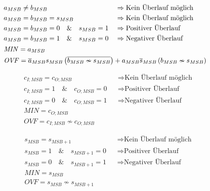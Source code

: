\begin{boxleft}
\end{boxleft}\begin{boxrightshaded}
\begin{align*}
&\begin{aligned}
&a_{MSB}\neq b_{MSB}\hfill&&\Rightarrow \text{Kein Überlauf möglich}\\
&a_{MSB}=b_{MSB}=s_{MSB}&&\Rightarrow \text{Kein Überlauf möglich}\\
&a_{MSB}=b_{MSB}=0 \quad\&\quad s_{MSB}=1&&\Rightarrow \text{Positiver Überlauf}\\
&a_{MSB}=b_{MSB}=1 \quad\&\quad s_{MSB}=0&&\Rightarrow \text{Negativer Überlauf}
\end{aligned}\\
&\mathit{MIN}=a_{MSB}\\
&\mathit{OVF}=\overline{a}_{MSB}s_{MSB}\left(\overline{b_{MSB}\nsim s_{MSB}}\right)+a_{MSB}\overline{s}_{MSB}\left(b_{MSB}\nsim s_{MSB}\right)
\end{align*}
\end{boxrightshaded}

\begin{boxleft}
\end{boxleft}\begin{boxrightshaded}
\begin{align*}
&c_{I;MSB}= c_{O;MSB}&&\Rightarrow \text{Kein Überlauf möglich}\\
&c_{I;MSB}=1\quad\&\quad c_{O;MSB}=0&&\Rightarrow \text{Positiver Überlauf}\\
&c_{I;MSB}=0\quad\&\quad c_{O;MSB}=1&&\Rightarrow \text{Negativer Überlauf}\\
&\mathit{MIN}=c_{O;MSB}\\
&\mathit{OVF}=c_{I;MSB}\nsim c_{O;MSB}
\end{align*}
\end{boxrightshaded}

\begin{boxleft}
\end{boxleft}\begin{boxrightshaded}
\begin{align*}
&s_{MSB}= s_{MSB+1}&&\Rightarrow \text{Kein Überlauf möglich}\\
&s_{MSB}=1\quad\&\quad s_{MSB+1}=0&&\Rightarrow \text{Positiver Überlauf}\\
&s_{MSB}=0\quad\&\quad s_{MSB+1}=1&&\Rightarrow \text{Negativer Überlauf}\\
&\mathit{MIN}=s_{MSB}\\
&\mathit{OVF}=s_{MSB}\nsim s_{MSB+1}
\end{align*}
\end{boxrightshaded}

